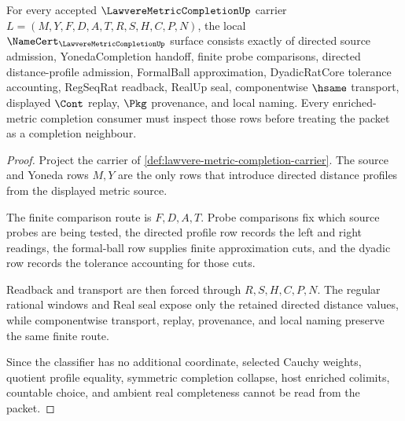 \begin{theorem}
\label{thm:lawvere-metric-completion-namecert-obligations}
For every accepted $\LawvereMetricCompletionUp$ carrier $L=(M,Y,F,D,A,T,R,S,H,C,P,N)$, the local $\NameCert_{\LawvereMetricCompletionUp}$ surface consists exactly of directed source admission, YonedaCompletion handoff, finite probe comparisons, directed distance-profile admission, FormalBall approximation, DyadicRatCore tolerance accounting, RegSeqRat readback, RealUp seal, componentwise $\hsame$ transport, displayed $\Cont$ replay, $\Pkg$ provenance, and local naming. Every enriched-metric completion consumer must inspect those rows before treating the packet as a completion neighbour.
\end{theorem}
\begin{proof}
Project the carrier of \autoref{def:lawvere-metric-completion-carrier}. The source and Yoneda rows $M,Y$ are the only rows that introduce directed distance profiles from the displayed metric source.

The finite comparison route is $F,D,A,T$. Probe comparisons fix which source probes are being tested, the directed profile row records the left and right readings, the formal-ball row supplies finite approximation cuts, and the dyadic row records the tolerance accounting for those cuts.

Readback and transport are then forced through $R,S,H,C,P,N$. The regular rational windows and Real seal expose only the retained directed distance values, while componentwise transport, replay, provenance, and local naming preserve the same finite route.

Since the classifier has no additional coordinate, selected Cauchy weights, quotient profile equality, symmetric completion collapse, host enriched colimits, countable choice, and ambient real completeness cannot be read from the packet.
\end{proof}

